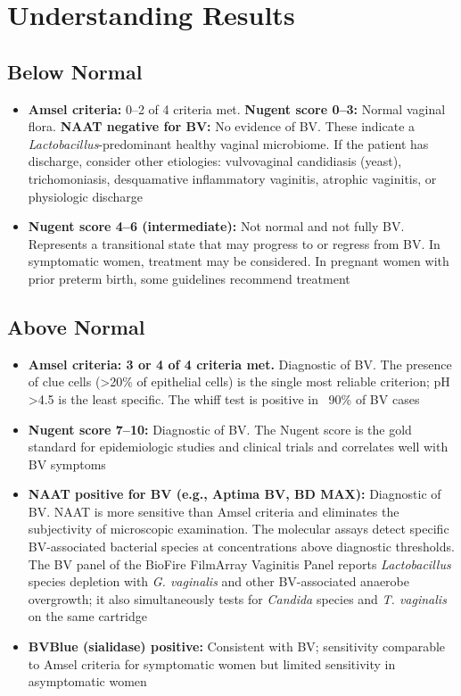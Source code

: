 \section*{Understanding Results}

\subsection*{Below Normal}
\begin{itemize}
  \item \textbf{Amsel criteria:} 0--2 of 4 criteria met. \textbf{Nugent score 0--3:} Normal vaginal flora. \textbf{NAAT negative for BV:} No evidence of BV. These indicate a \textit{Lactobacillus}-predominant healthy vaginal microbiome. If the patient has discharge, consider other etiologies: vulvovaginal candidiasis (yeast), trichomoniasis, desquamative inflammatory vaginitis, atrophic vaginitis, or physiologic discharge
  \item \textbf{Nugent score 4--6 (intermediate):} Not normal and not fully BV. Represents a transitional state that may progress to or regress from BV. In symptomatic women, treatment may be considered. In pregnant women with prior preterm birth, some guidelines recommend treatment
\end{itemize}

\subsection*{Above Normal}
\begin{itemize}
  \item \textbf{Amsel criteria: 3 or 4 of 4 criteria met.} Diagnostic of BV. The presence of clue cells (>20\% of epithelial cells) is the single most reliable criterion; pH >4.5 is the least specific. The whiff test is positive in ~90\% of BV cases
  \item \textbf{Nugent score 7--10:} Diagnostic of BV. The Nugent score is the gold standard for epidemiologic studies and clinical trials and correlates well with BV symptoms
  \item \textbf{NAAT positive for BV (e.g., Aptima BV, BD MAX):} Diagnostic of BV. NAAT is more sensitive than Amsel criteria and eliminates the subjectivity of microscopic examination. The molecular assays detect specific BV-associated bacterial species at concentrations above diagnostic thresholds. The BV panel of the BioFire FilmArray Vaginitis Panel reports \textit{Lactobacillus} species depletion with \textit{G. vaginalis} and other BV-associated anaerobe overgrowth; it also simultaneously tests for \textit{Candida} species and \textit{T. vaginalis} on the same cartridge
  \item \textbf{BVBlue (sialidase) positive:} Consistent with BV; sensitivity comparable to Amsel criteria for symptomatic women but limited sensitivity in asymptomatic women
\end{itemize}

